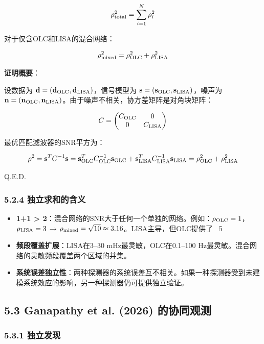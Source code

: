 \documentclass[12pt,a4paper]{article}
\begin{document}
$$\rho_{\rm total}^2 = \sum_{i=1}^N \rho_i^2$$

对于仅含OLC和LISA的混合网络：

$$\rho_{\rm mixed}^2 = \rho_{\rm OLC}^2 + \rho_{\rm LISA}^2$$

\textbf{证明概要}：

设数据为 ${\bf d} = ({\bf d}_{\rm OLC}, {\bf d}_{\rm LISA})$，信号模型为 ${\bf s} = ({\bf s}_{\rm OLC}, {\bf s}_{\rm LISA})$，噪声为 ${\bf n} = ({\bf n}_{\rm OLC}, {\bf n}_{\rm LISA})$。由于噪声不相关，协方差矩阵是对角块矩阵：

$$C = \begin{pmatrix} C_{\rm OLC} & 0 \\ 0 & C_{\rm LISA} \end{pmatrix}$$

最优匹配滤波器的SNR平方为：

$$\rho^2 = {\bf s}^T C^{-1} {\bf s} = {\bf s}_{\rm OLC}^T C_{\rm OLC}^{-1} {\bf s}_{\rm OLC} + {\bf s}_{\rm LISA}^T C_{\rm LISA}^{-1} {\bf s}_{\rm LISA} = \rho_{\rm OLC}^2 + \rho_{\rm LISA}^2$$

Q.E.D.

\subsubsection{5.2.4 独立求和的含义}


\begin{itemize}
  \item[1] \textbf{1+1 > 2}：混合网络的SNR大于任何一个单独的网络。例如：$\rho_{\rm OLC} = 1$，$\rho_{\rm LISA} = 3$ → $\rho_{\rm mixed} = \sqrt{10} \approx 3.16$。LISA主导，但OLC提供了 ~5%

  \item[2] \textbf{频段覆盖扩展}：LISA在3–30 mHz最灵敏，OLC在0.1–100 Hz最灵敏。混合网络的灵敏频段覆盖两个区域的并集。

  \item[3] \textbf{系统误差独立性}：两种探测器的系统误差互不相关。如果一种探测器受到未建模系统效应的影响，另一种探测器仍可提供独立验证。

\end{itemize}
\subsection{5.3 Ganapathy et al. (2026) 的协同观测}


\subsubsection{5.3.1 独立发现}
\end{document}
